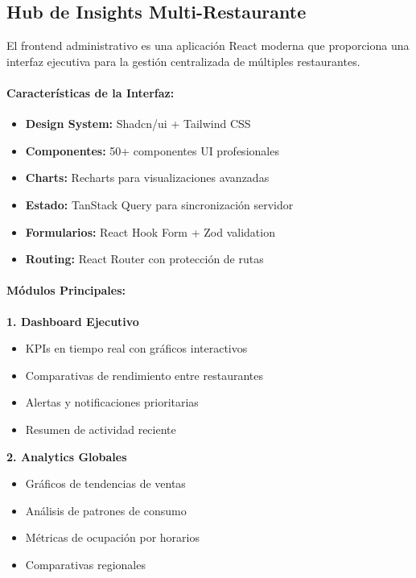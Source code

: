 \documentclass[12pt,a4paper]{article}
\begin{document}
\subsection{Hub de Insights Multi-Restaurante}

El frontend administrativo es una aplicación React moderna que proporciona una interfaz ejecutiva para la gestión centralizada de múltiples restaurantes.

\paragraph{Características de la Interfaz:}
\begin{itemize}
    \item \textbf{Design System:} Shadcn/ui + Tailwind CSS
    \item \textbf{Componentes:} 50+ componentes UI profesionales
    \item \textbf{Charts:} Recharts para visualizaciones avanzadas
    \item \textbf{Estado:} TanStack Query para sincronización servidor
    \item \textbf{Formularios:} React Hook Form + Zod validation
    \item \textbf{Routing:} React Router con protección de rutas
\end{itemize}

\paragraph{Módulos Principales:}

\textbf{1. Dashboard Ejecutivo}
\begin{itemize}
    \item KPIs en tiempo real con gráficos interactivos
    \item Comparativas de rendimiento entre restaurantes
    \item Alertas y notificaciones prioritarias
    \item Resumen de actividad reciente
\end{itemize}

\textbf{2. Analytics Globales}
\begin{itemize}
    \item Gráficos de tendencias de ventas
    \item Análisis de patrones de consumo
    \item Métricas de ocupación por horarios
    \item Comparativas regionales
\end{itemize}
\end{document}
